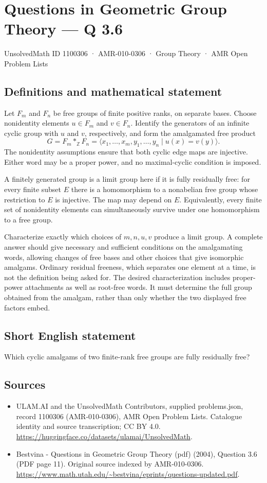 \documentclass[11pt,a4paper]{article}
\begin{document}
\section*{Questions in Geometric Group Theory — Q 3.6}\label{1100306}
{\small UnsolvedMath ID 1100306 · AMR-010-0306 · Group Theory · AMR Open Problem Lists}
\subsection{Definitions and mathematical statement}
Let $F_m$ and $F_n$ be free groups of finite positive ranks, on separate bases. Choose nonidentity elements $u\in F_m$ and $v\in F_n$. Identify the generators of an infinite cyclic group with $u$ and $v$, respectively, and form the amalgamated free product
\[
 G=F_m*_{\mathbb Z}F_n
   =\langle x_1,\ldots,x_m,y_1,\ldots,y_n\mid u(x)=v(y)\rangle.
\]
The nonidentity assumptions ensure that both cyclic edge maps are injective. Either word may be a proper power, and no maximal-cyclic condition is imposed.

A finitely generated group is a limit group here if it is fully residually free: for every finite subset $E$ there is a homomorphism to a nonabelian free group whose restriction to $E$ is injective. The map may depend on $E$. Equivalently, every finite set of nonidentity elements can simultaneously survive under one homomorphism to a free group.

Characterize exactly which choices of $m,n,u,v$ produce a limit group. A complete answer should give necessary and sufficient conditions on the amalgamating words, allowing changes of free bases and other choices that give isomorphic amalgams. Ordinary residual freeness, which separates one element at a time, is not the definition being asked for. The desired characterization includes proper-power attachments as well as root-free words. It must determine the full group obtained from the amalgam, rather than only whether the two displayed free factors embed.
\subsection{Short English statement}
Which cyclic amalgams of two finite-rank free groups are fully residually free?
\subsection{Sources}
\begin{itemize}
\item[S1] ULAM.AI and the UnsolvedMath Contributors, supplied problems.json, record 1100306 (AMR-010-0306), AMR Open Problem Lists. Catalogue identity and source transcription; CC BY 4.0.
\url{https://huggingface.co/datasets/ulamai/UnsolvedMath}.
\item[S2] Bestvina - Questions in Geometric Group Theory (pdf) (2004), Question 3.6 (PDF page 11). Original source indexed by AMR-010-0306.
\url{https://www.math.utah.edu/~bestvina/eprints/questions-updated.pdf}.
\end{itemize}
\end{document}
